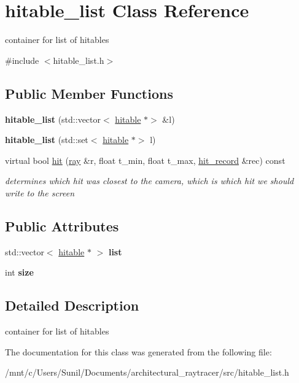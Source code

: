 \hypertarget{classhitable__list}{}\section{hitable\+\_\+list Class Reference}
\label{classhitable__list}


container for list of hitables  




{\ttfamily \#include $<$hitable\+\_\+list.\+h$>$}

\subsection*{Public Member Functions}
\begin{DoxyCompactItemize}
\item 
\mbox{\label{classhitable__list_a0c1dab103dda041579706e24a7f78231}} 
{\bfseries hitable\+\_\+list} (std\+::vector$<$ \hyperlink{classhitable}{hitable} $\ast$$>$ \&l)
\item 
\mbox{\label{classhitable__list_ac265dba85d1015b107c373afcfb461bc}} 
{\bfseries hitable\+\_\+list} (std\+::set$<$ \hyperlink{classhitable}{hitable} $\ast$$>$ l)
\item 
\mbox{\label{classhitable__list_ae82f658aabc8bab40c82414f482818d8}} 
virtual bool \hyperlink{classhitable__list_ae82f658aabc8bab40c82414f482818d8}{hit} (\hyperlink{classray}{ray} \&r, float t\+\_\+min, float t\+\_\+max, \hyperlink{structhit__record}{hit\+\_\+record} \&rec) const
\begin{DoxyCompactList}\small\item\em determines which hit was closest to the camera, which is which hit we should write to the screen \end{DoxyCompactList}\end{DoxyCompactItemize}
\subsection*{Public Attributes}
\begin{DoxyCompactItemize}
\item 
\mbox{\label{classhitable__list_a79ba2224e3e31303544a201d86a7c8e1}} 
std\+::vector$<$ \hyperlink{classhitable}{hitable} $\ast$ $>$ {\bfseries list}
\item 
\mbox{\label{classhitable__list_a259f330cc386189851e00041458fefd1}} 
int {\bfseries size}
\end{DoxyCompactItemize}


\subsection{Detailed Description}
container for list of hitables 

The documentation for this class was generated from the following file\+:\begin{DoxyCompactItemize}
\item 
/mnt/c/\+Users/\+Sunil/\+Documents/architectural\+\_\+raytracer/src/hitable\+\_\+list.\+h\end{DoxyCompactItemize}
